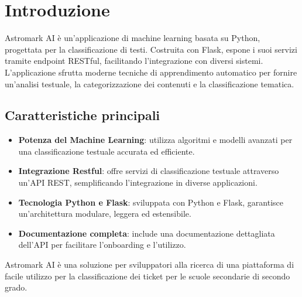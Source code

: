 \chapter{Introduzione}

\sloppy
Astromark AI è un'applicazione di machine learning basata su Python, progettata per la classificazione  di testi. Costruita con Flask, espone i suoi servizi tramite endpoint RESTful, facilitando l'integrazione con diversi sistemi. L'applicazione sfrutta moderne tecniche di apprendimento automatico per fornire un'analisi testuale, la categorizzazione dei contenuti e la classificazione tematica.

\section{Caratteristiche principali}

\begin{itemize}
    \item \textbf{Potenza del Machine Learning}: utilizza algoritmi e modelli avanzati per una classificazione testuale accurata ed efficiente.
    \item \textbf{Integrazione Restful}: offre servizi di classificazione testuale attraverso un'API REST, semplificando l'integrazione in diverse applicazioni.
    \item \textbf{Tecnologia Python e Flask}: sviluppata con Python e Flask, garantisce un'architettura modulare, leggera ed estensibile.
    \item \textbf{Documentazione completa}: include una documentazione dettagliata dell'API per facilitare l'onboarding e l'utilizzo.
\end{itemize}

Astromark AI è una soluzione per sviluppatori alla ricerca di una piattaforma di facile utilizzo per la classificazione dei ticket per le scuole secondarie di secondo grado.
\newpage
